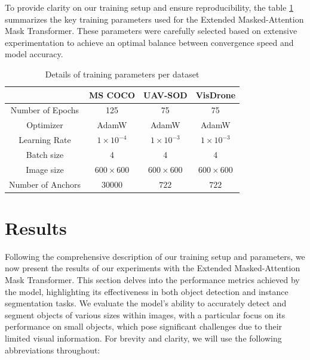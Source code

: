 To provide clarity on our training setup and ensure reproducibility, the table \ref{tab:training_parameters} summarizes the key training parameters used for the 
Extended Masked-Attention Mask Transformer. These parameters were carefully selected based on extensive experimentation to achieve an optimal balance between 
convergence speed and model accuracy. 
\begin{table}[h]
\centering
\begin{tabular}{|c|c|c|c|}
    \hline
    &                   \textbf{MS COCO}      & \textbf{UAV-SOD}     & \textbf{VisDrone}            \\ \hline
    Number of Epochs   & 125                  & 75                   & 75                           \\ \hline
    Optimizer          & AdamW                & AdamW                & AdamW                        \\ \hline
    Learning Rate      & $1 \times 10^{-4}$   & $1 \times 10^{-3}$   & $1 \times 10^{-3}$           \\ \hline
    Batch size         & 4                    &  4                   & 4                            \\ \hline
    Image size         & $600\times600$       &  $600\times600$      & $600\times600$               \\ \hline
    Number of Anchors  & $30000$              &  $722$               & $722$                        \\ \hline
\end{tabular}
\caption{Details of training parameters per dataset}
\label{tab:training_parameters}
\end{table}

\newpage

\section{Results}

Following the comprehensive description of our training setup and parameters, we now present the results of our experiments with the Extended Masked-Attention 
Mask Transformer. This section delves into the performance metrics achieved by the model, highlighting its effectiveness in both object detection and instance 
segmentation tasks. We evaluate the model's ability to accurately detect and segment objects of various sizes within images, with a particular focus on its 
performance on small objects, which pose significant challenges due to their limited visual information. For brevity and clarity, we will use the following 
abbreviations throughout:

